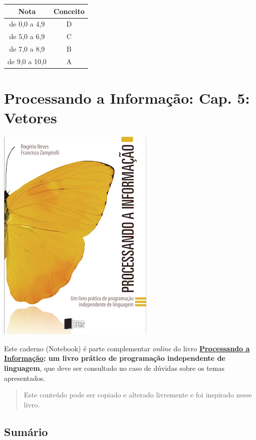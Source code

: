 \documentclass[12pt,a4paper]{article}
\begin{document}
\begin{longtable}[]{@{}cc@{}}
\toprule
Nota & Conceito\tabularnewline
\midrule
\endhead
de 0,0 a 4,9 & D\tabularnewline
de 5,0 a 6,9 & C\tabularnewline
de 7,0 a 8,9 & B\tabularnewline
de 9,0 a 10,0 & A\tabularnewline
\bottomrule
\end{longtable}

    \hypertarget{processando-a-informauxe7uxe3o-cap.-5-vetores}{%
\section{Processando a Informação: Cap. 5:
Vetores}\label{processando-a-informauxe7uxe3o-cap.-5-vetores}}

    \includegraphics{"figs/Capa_Processando_Informacao.jpg"}

Este caderno (Notebook) é parte complementar \emph{online} do livro
\textbf{\href{https://editora.ufabc.edu.br/matematica-e-ciencias-da-computacao/58-processando-a-informacao}{Processando
a Informação}: um livro prático de programação independente de
linguagem}, que deve ser consultado no caso de dúvidas sobre os temas
apresentados.

\begin{quote}
Este conteúdo pode ser copiado e alterado livremente e foi inspirado
nesse livro.
\end{quote}

    \hypertarget{sumuxe1rio}{%
\subsection{Sumário}\label{sumuxe1rio}}
\end{document}
